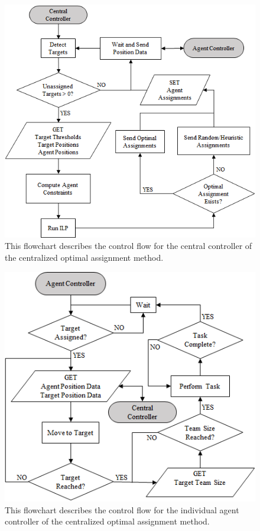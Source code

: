 \documentclass[11pt, onecolumn, compsoc, letterpaper]{article}
\begin{document}
\begin{figure}[!ht]
\centering\includegraphics[width=.65\columnwidth]{assets/CentralController.png}
\centering\caption{This flowchart describes the control flow for the central controller of the centralized optimal assignment method.}\label{fig:centralcontrol}
\end{figure}

\begin{figure}[!ht]
\centering\includegraphics[width=.65\columnwidth]{assets/AgentController.png}
\centering\caption{This flowchart describes the control flow for the individual agent controller of the centralized optimal assignment method.}\label{fig:centralagentcontrol}
\end{figure}

\end{document}
